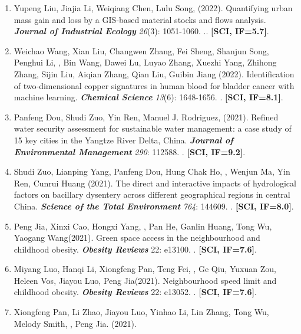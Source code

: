 \begin{enumerate}
    \textbf{\textit{Geospatial Health}} \textit{17}.
    . 
    \textbf{[SCI, IF=1.5]}.
\item
    Yupeng Liu\CF, Jiajia Li\CF, Weiqiang Chen\CS, Lulu Song, \Shaoqing \enspace (2022).
    Quantifying urban mass gain and loss by a GIS‐based material stocks and flows analysis.
    \textbf{\textit{Journal of Industrial Ecology}} \textit{26}(3): 1051-1060.
    .. 
    \textbf{[SCI, IF=5.7]}.
\item
    Weichao Wang\CF, Xian Liu\CF, Changwen Zhang, Fei Sheng, Shanjun Song, Penghui Li, \Shaoqing, Bin Wang, Dawei Lu, Luyao Zhang, Xuezhi Yang, Zhihong Zhang, Sijin Liu, Aiqian Zhang, Qian Liu\CS, Guibin Jiang (2022).
    Identification of two-dimensional copper signatures in human blood for bladder cancer with machine learning.
    \textbf{\textit{Chemical Science}} \textit{13}(6): 1648-1656.
    .  
    \textbf{[SCI, IF=8.1]}.
\item
    Panfeng Dou, Shudi Zuo\CS, Yin Ren\CS, Manuel J. Rodriguez, \Shaoqing \enspace (2021).
    Refined water security assessment for sustainable water management: a case study of 15 key cities in the Yangtze River Delta, China.
    \textbf{\textit{Journal of Environmental Management}} \textit{290}: 112588.
    . 
    \textbf{[SCI, IF=9.2]}.
\item
    Shudi Zuo, Lianping Yang\CS, Panfeng Dou, Hung Chak Ho, \Shaoqing, Wenjun Ma, Yin Ren, Cunrui Huang (2021).
    The direct and interactive impacts of hydrological factors on bacillary dysentery across different geographical regions in central China.
    \textbf{\textit{Science of the Total Environment}} \textit{764}: 144609.
    . 
    \textbf{[SCI, IF=8.0]}.
\item
    Peng Jia\CF, Xinxi Cao\CF, Hongxi Yang, \Shaoqing, Pan He, Ganlin Huang, Tong Wu, Yaogang Wang\CS (2021).
    Green space access in the neighbourhood and childhood obesity.
    \textbf{\textit{Obesity Reviews}} 22: e13100.
    .
    \textbf{[SCI, IF=7.6]}.
\item
    Miyang Luo, Hanqi Li, Xiongfeng Pan, Teng Fei, \Shaoqing, Ge Qiu, Yuxuan Zou, Heleen Vos, Jiayou Luo, Peng Jia\CS (2021).
    Neighbourhood speed limit and childhood obesity.
    \textbf{\textit{Obesity Reviews}} 22: e13052.
    . 
    \textbf{[SCI, IF=7.6]}.
\item
    Xiongfeng Pan, Li Zhao, Jiayou Luo, Yinhao Li, Lin Zhang, Tong Wu, Melody Smith, \Shaoqing, Peng Jia\CS. (2021).

\end{enumerate}
